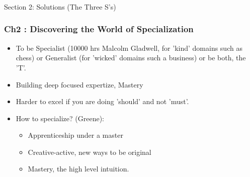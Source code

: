 \begin{frame}[fragile]\frametitle{}
\begin{center}
{\Large Section 2: Solutions (The Three S's)}

\end{center}
\end{frame}
\begin{frame}[fragile]\frametitle{Ch2 : Discovering the World of Specialization}

\begin{itemize}
\item To be Specialist (10000 hrs Malcolm Gladwell, for 'kind' domains such as chess) or Generalist (for 'wicked' domains such a business) or be both, the 'T'.
\item Building deep focused expertize, Mastery
\item Harder to excel if you are doing 'should' and not 'must'.
\item How to specialize? (Greene):
	\begin{itemize}
	\item Apprenticeship under a master
	\item Creative-active, new ways to be original
	\item Mastery, the high level intuition.
	\end{itemize}
\end{itemize}

\end{frame}

